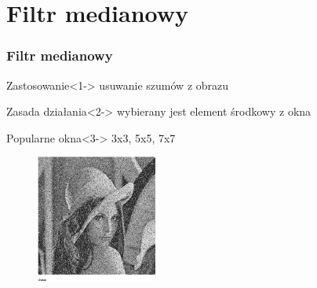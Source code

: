 \documentclass{beamer}
\begin{document}
\section{Filtr medianowy}
\begin{frame}
\frametitle{Filtr medianowy}
\begin{block}{Zastosowanie}<1->
usuwanie szumów z obrazu
\end{block}
\begin{block}{Zasada działania}<2->
wybierany jest element środkowy z okna
\end{block}
\begin{block}{Popularne okna}<3->
3x3, 5x5, 7x7
\end{block}
\end{frame}
\begin{frame}
\begin{figure}
\hspace{-200px}
\includegraphics[width=150px]{medianowy_szum}
\end{figure}
\begin{figure}
\end{figure}
\end{frame}
\end{document}
